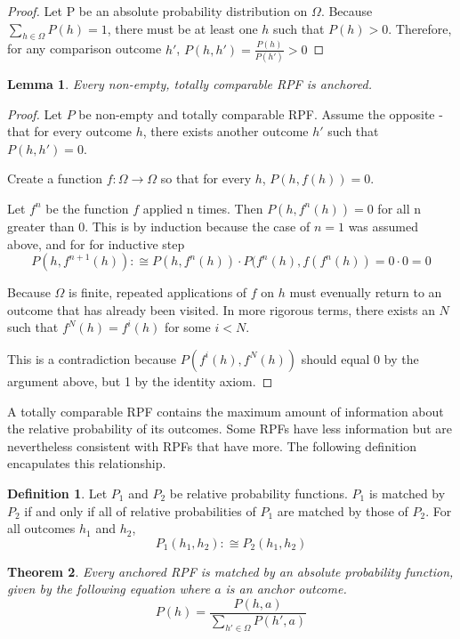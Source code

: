 \documentclass[twoside]{article}
\theoremstyle{plain}%
\newtheorem{theorem}{Theorem}[section]
\newtheorem{lemma}[theorem]{Lemma}
\theoremstyle{definition}
\newtheorem{definition}{Definition}[section]
\theoremstyle{remark}
\begin{document}
\begin{proof}
Let P be an absolute probability distribution on \(\Omega\). Because \(\sum_{h \in \Omega} P(h) = 1\), there must be at least one \(h\) such that \(P(h) > 0\).  Therefore, for any comparison outcome \(h'\), \(P(h, h') = \frac{P(h)}{P(h')} > 0\)
\end{proof}

\begin{lemma}
\label{lemma:totally_comp_anchored}
Every non-empty, totally comparable RPF is anchored.
\end{lemma}

\begin{proof}
Let \(P\) be non-empty and totally comparable RPF. Assume the opposite - that for every outcome \(h\), there exists another outcome \(h'\) such that \(P(h, h') = 0\).

Create a function \(f: \Omega \rightarrow \Omega\) so that for every \(h\), \(P(h, f(h)) = 0\).

Let \(f^n\) be the function \(f\) applied n times. Then \(P(h, f^n(h)) = 0\) for all n greater than 0. This is by induction because the case of \(n = 1\) was assumed above, and for for inductive step
\[P(h, f^{n+1}(h)) :\cong P(h, f^n(h)) \cdot P(f^n(h), f(f^n(h)) = 0 \cdot 0 = 0\]

Because \(\Omega\) is finite, repeated applications of \(f\) on \(h\) must evenually return to an outcome that has already been visited. In more rigorous terms, there exists an \(N\) such that \(f^N(h) = f^i(h)\) for some \(i < N\).

This is a contradiction because \(P(f^i(h), f^N(h))\) should equal 0 by the argument above, but 1 by the identity axiom.
\end{proof}

A totally comparable RPF contains the maximum amount of information about the relative probability of its outcomes. Some RPFs have less information but are nevertheless consistent with RPFs that have more. The following definition encapulates this relationship.

\begin{definition}
Let \(P_1\) and \(P_2\) be relative probability functions. \(P_1\) is matched by \(P_2\) if and only if all of relative probabilities of \(P_1\) are matched by those of \(P_2\). For all outcomes \(h_1\) and \(h_2\),
\[P_1(h_1, h_2) :\cong P_2(h_1, h_2)\]
\end{definition}

\begin{theorem}
\label{thm:absolute_prob_formula}
Every anchored RPF is matched by an absolute probability function, given by the following equation where \(a\) is an anchor outcome.
\[P(h) = \frac{P(h, a)}{\sum_{h' \in \Omega}P(h', a)}\]
\end{theorem}
\end{document}
